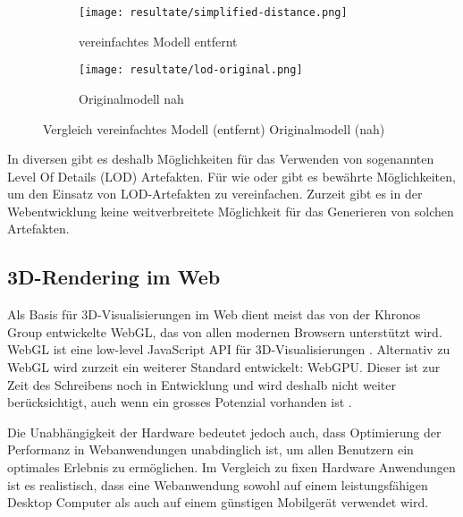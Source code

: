 \begin{figure}[H]
  \centering
  \begin{subfigure}{.4\textwidth}
    \centering
    \texttt{[image: resultate/simplified-distance.png]}
    \caption{vereinfachtes Modell entfernt}
    \label{fig:lodComparisonSimplified}
  \end{subfigure}
  \begin{subfigure}{.4\textwidth}
    \centering
    \texttt{[image: resultate/lod-original.png]}
    \caption{Originalmodell nah}
    \label{fig:lodComparisonOriginal}
  \end{subfigure}
  \caption{Vergleich vereinfachtes Modell (entfernt) Originalmodell (nah)}
\end{figure}

In diversen  gibt es deshalb Möglichkeiten für das Verwenden von sogenannten Level Of Details (LOD) Artefakten.
Für  wie  oder  gibt es bewährte Möglichkeiten, um den Einsatz von LOD-Artefakten zu vereinfachen. Zurzeit gibt es in der Webentwicklung keine weitverbreitete Möglichkeit für das Generieren von solchen Artefakten.

\subsection{3D-Rendering im Web}

Als Basis für 3D-Visualisierungen im Web dient meist das von der Khronos Group entwickelte WebGL, das von allen modernen Browsern unterstützt wird. WebGL ist eine low-level JavaScript API für 3D-Visualisierungen \cite{webGl1Spec}.
Alternativ zu WebGL wird zurzeit ein weiterer Standard entwickelt: WebGPU. Dieser ist zur Zeit des Schreibens noch in Entwicklung und wird deshalb nicht weiter berücksichtigt, auch wenn ein grosses Potenzial vorhanden ist \cite{webGPUCharter}.

Die Unabhängigkeit der Hardware bedeutet jedoch auch, dass Optimierung der Performanz in Webanwendungen unabdinglich ist, um allen Benutzern ein optimales Erlebnis zu ermöglichen.
Im Vergleich zu fixen Hardware Anwendungen ist es realistisch, dass eine Webanwendung sowohl auf einem leistungsfähigen Desktop Computer als auch auf einem günstigen Mobilgerät verwendet wird.


